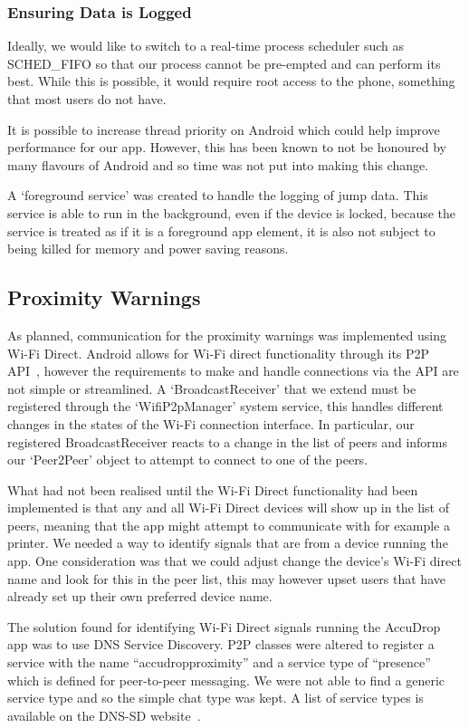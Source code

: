\subsubsection{Ensuring Data is Logged}
Ideally, we would like to switch to a real-time process scheduler such as SCHED\_FIFO so that our process cannot be pre-empted and can perform its best. While this is possible, it would require root access to the phone, something that most users do not have.

It is possible to increase thread priority on Android which could help improve performance for our app. However, this has been known to not be honoured by many flavours of Android and so time was not put into making this change.

A `foreground service' was created to handle the logging of jump data. This service is able to run in the background, even if the device is locked, because the service is treated as if it is a foreground app element, it is also not subject to being killed for memory and power saving reasons.

\subsection{Proximity Warnings}
As planned, communication for the proximity warnings was implemented using Wi-Fi Direct. Android allows for Wi-Fi direct functionality through its P2P API~\cite{_creating_????}, however the requirements to make and handle connections via the API are not simple or streamlined. A `BroadcastReceiver' that we extend must be registered through the `WifiP2pManager' system service, this handles different changes in the states of the Wi-Fi connection interface. In particular, our registered BroadcastReceiver reacts to a change in the list of peers and informs our `Peer2Peer' object to attempt to connect to one of the peers.

What had not been realised until the Wi-Fi Direct functionality had been implemented is that any and all Wi-Fi Direct devices will show up in the list of peers, meaning that the app might attempt to communicate with for example a printer. We needed a way to identify signals that are from a device running the app. One consideration was that we could adjust change the device's Wi-Fi direct name and look for this in the peer list, this may however upset users that have already set up their own preferred device name.

The solution found for identifying Wi-Fi Direct signals running the AccuDrop app was to use DNS Service Discovery. P2P classes were altered to register a service with the name ``accudropproximity'' and a service type of ``presence'' which is defined for peer-to-peer messaging. We were not able to find a generic service type and so the simple chat type was kept. A list of service types is available on the DNS-SD website~\cite{_dns_????}.

